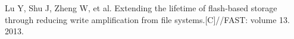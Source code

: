 
\begin{translationbib}
\item Lu Y, Shu J, Zheng W, et al. Extending the lifetime of flash-based storage through reducing write amplification from file systems.[C]//FAST: volume 13. 2013.
\end{translationbib}
